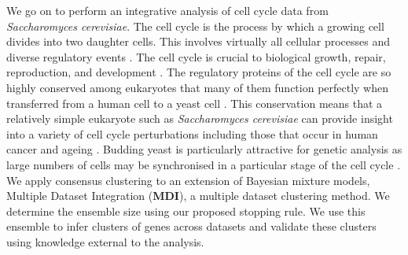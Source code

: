 \documentclass{article}
\begin{document}
We go on to perform an integrative analysis of cell cycle data from \emph{Saccharomyces cerevisiae}. The cell cycle is the process by which a growing cell divides into two daughter cells. This involves virtually all cellular processes 
and diverse regulatory events \citep{granovskaia2010high}. The cell cycle is crucial to biological growth, repair, reproduction, and development
\citep{tyson2013cell, chen2004integrative, alberts2018molecular}. The regulatory proteins of the 
cell cycle are so highly conserved among eukaryotes that many of them function perfectly when transferred from a human cell to a yeast cell \citep{alberts2018molecular}. This conservation means that a relatively simple eukaryote such as \emph{Saccharomyces cerevisiae} can provide insight into a variety of cell cycle perturbations including those that occur in human cancer \citep{ingalls2007systems, chen2004integrative} and ageing \citep{jimenez2015live}. Budding yeast is particularly attractive for genetic analysis as
large numbers of cells may be synchronised in a particular stage of the cell cycle  \citep{juanes2017methods}. We apply consensus clustering to an extension of Bayesian mixture models, Multiple Dataset Integration (\textbf{MDI}), a multiple dataset clustering method. 
We determine the ensemble size using our proposed stopping rule. We use this ensemble to infer clusters of genes across datasets and validate these clusters using knowledge external to the analysis. 

\end{document}
